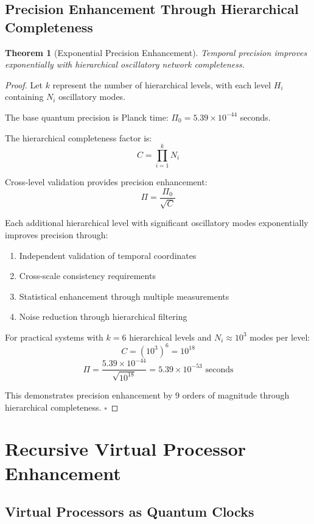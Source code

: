 \documentclass[12pt,a4paper]{article}
\newtheorem{theorem}{Theorem}
\begin{document}
\subsection{Precision Enhancement Through Hierarchical Completeness}

\begin{theorem}[Exponential Precision Enhancement]
Temporal precision improves exponentially with hierarchical oscillatory network completeness.
\end{theorem}

\begin{proof}
Let $k$ represent the number of hierarchical levels, with each level $H_i$ containing $N_i$ oscillatory modes.

The base quantum precision is Planck time: $\Pi_0 = 5.39 \times 10^{-44}$ seconds.

The hierarchical completeness factor is:
$$C = \prod_{i=1}^{k} N_i$$

Cross-level validation provides precision enhancement:
$$\Pi = \frac{\Pi_0}{\sqrt{C}}$$

Each additional hierarchical level with significant oscillatory modes exponentially improves precision through:
\begin{enumerate}
\item Independent validation of temporal coordinates
\item Cross-scale consistency requirements
\item Statistical enhancement through multiple measurements
\item Noise reduction through hierarchical filtering
\end{enumerate}

For practical systems with $k = 6$ hierarchical levels and $N_i \approx 10^3$ modes per level:
$$C = (10^3)^6 = 10^{18}$$
$$\Pi = \frac{5.39 \times 10^{-44}}{\sqrt{10^{18}}} = 5.39 \times 10^{-53} \text{ seconds}$$

This demonstrates precision enhancement by 9 orders of magnitude through hierarchical completeness. $\square$
\end{proof}

\section{Recursive Virtual Processor Enhancement}

\subsection{Virtual Processors as Quantum Clocks}
\end{document}
